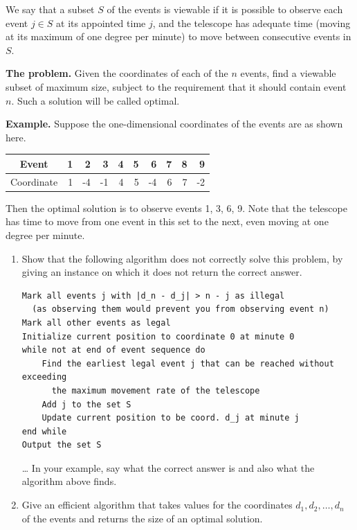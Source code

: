 \documentclass[12pt,a4paper]{article}
\begin{document}
We say that a subset $S$ of the events is viewable if it is possible to observe each event $j\in S$ at its appointed time $j$, and the telescope has adequate time (moving at its maximum of one degree per minute) to move between consecutive events in $S$.

\textbf{The problem.} Given the coordinates of each of the $n$ events, find a viewable subset of maximum size, subject to the requirement that it should contain event $n$. Such a solution will be called optimal.

\textbf{Example.} Suppose the one-dimensional coordinates of the events are as shown here.

\begin{center}
\begin{tabular}{c|rrrrrrrrr}
Event      & 1 & 2  & 3  & 4 & 5 & 6  & 7 & 8 & 9 \\
\hline
Coordinate & 1 & -4 & -1 & 4 & 5 & -4 & 6 & 7 & -2
\end{tabular}
\end{center}

Then the optimal solution is to observe events 1, 3, 6, 9. Note that the telescope has time to move from one event in this set to the next, even moving at one degree per minute.

\begin{enumerate}[label=(\alph*), leftmargin=2em]
\item Show that the following algorithm does not correctly solve this problem, by giving an instance on which it does not return the correct answer.

\begin{Verbatim}[fontsize=\small]
Mark all events j with |d_n - d_j| > n - j as illegal
  (as observing them would prevent you from observing event n)
Mark all other events as legal
Initialize current position to coordinate 0 at minute 0
while not at end of event sequence do
    Find the earliest legal event j that can be reached without exceeding
      the maximum movement rate of the telescope
    Add j to the set S
    Update current position to be coord. d_j at minute j
end while
Output the set S
\end{Verbatim}


\ldots{} In your example, say what the correct answer is and also what the algorithm above finds.

\item Give an efficient algorithm that takes values for the coordinates $d_1,d_2,\ldots,d_n$ of the events and returns the size of an optimal solution.
\end{enumerate}
\end{document}
